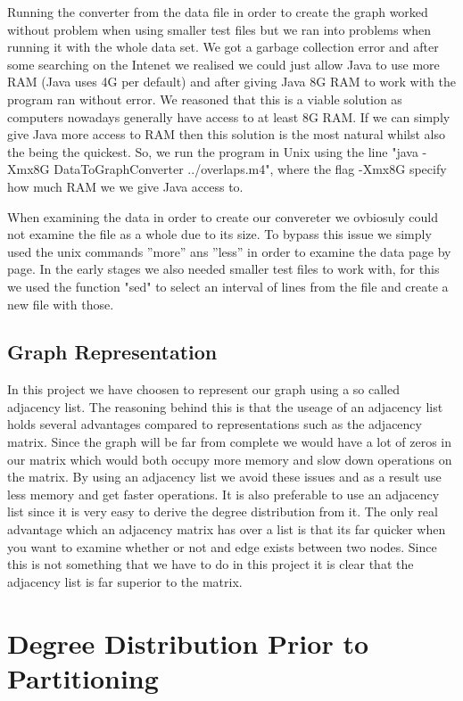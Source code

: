 \documentclass[a4paper,10pt]{article}
\begin{document}
Running the converter from the data file in order to create the graph worked without problem when using smaller test files but we ran into problems when running it with the whole data set. We got a garbage collection error and after some searching on the Intenet we realised we could just allow Java to use more RAM (Java uses 4G per default) and after giving Java 8G RAM to work with the program ran without error. We reasoned that this is a viable solution as computers nowadays generally have access to at least 8G RAM. 
If we can simply give Java more access to RAM then this solution is the most natural whilst also the being the quickest. So, we run the program in Unix using the line "java -Xmx8G DataToGraphConverter ../overlaps.m4", where the flag -Xmx8G specify how much RAM we we give Java access to.

\medskip

When examining the data in order to create our convereter we ovbiosuly could not examine the file as a whole due to its size. To bypass this issue we simply used the unix commands ''more'' ans ''less'' in order to examine the data page by page. In the early stages we also needed smaller test files to work with, for this we used the function "sed" to select an interval of lines from the file and create a new file with those. 

\subsection{Graph Representation}

In this project we have choosen to represent our graph using a so called adjacency list. The reasoning behind this is that the useage of an adjacency list holds several advantages compared to representations such as the adjacency matrix. Since the graph will be far from complete we would have a lot of zeros in our matrix which would both occupy more memory and slow down operations on the matrix. By using an adjacency list we avoid these issues and as a result use less memory and get faster operations. It is also preferable to use an adjacency list since it is very easy to derive the degree distribution from it. The only real advantage which an adjacency matrix has over a list is that its far quicker when you want to examine whether or not and edge exists between two nodes. Since this is not something that we have to do in this project it is clear that the adjacency list is far superior to the matrix. 

\section{Degree Distribution Prior to Partitioning}
\end{document}
